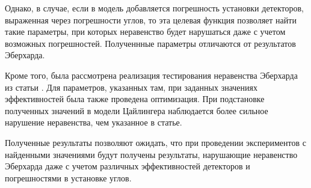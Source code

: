 \documentclass[11pt]{article}
\begin{document}
Однако, в случае, если в модель добавляется погрешность установки детекторов, выраженная через погрешности углов, то эта целевая функция позволяет найти такие параметры, при которых неравенство будет нарушаться даже с учетом возможных погрешностей. Полученнные параметры отличаются от результатов Эберхарда.

Кроме того, была рассмотрена реализация тестирования неравенства Эберхарда из статьи \cite{Zeilinger}. Для параметров, указанных там, при заданных значениях эффективностей была также проведена оптимизация. При подстановке полученных значений в модели Цайлингера наблюдается более сильное нарушение неравенства, чем указанное в статье.

Полученные результаты позволяют ожидать, что при проведении экспериментов с найденными значениями будут получены результаты, нарушающие неравенство Эберхарда даже с учетом различных эффективностей детекторов и погрешностями в установке углов.



\end{document}
